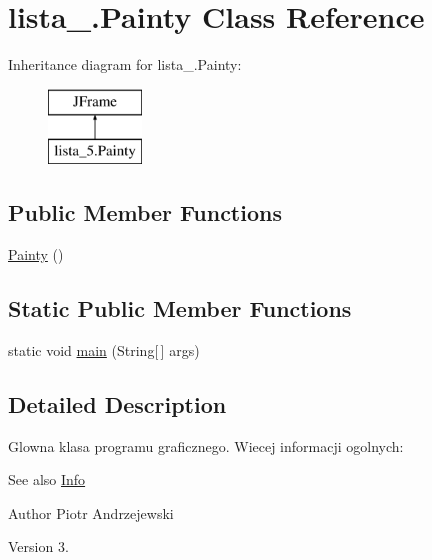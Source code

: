 \hypertarget{classlista__5_1_1_painty}{}\section{lista\+\_.\+Painty Class Reference}
\label{classlista__5_1_1_painty}
Inheritance diagram for lista\+\_.\+Painty\+:\begin{figure}[H]
\begin{center}
\leavevmode
\includegraphics[height=2.000000cm]{classlista__5_1_1_painty}
\end{center}
\end{figure}
\subsection*{Public Member Functions}
\begin{DoxyCompactItemize}
\item 
\mbox{\hyperlink{classlista__5_1_1_painty_a71b4b4d6f8515244d5bd42fe8673d5fd}{Painty}} ()
\end{DoxyCompactItemize}
\subsection*{Static Public Member Functions}
\begin{DoxyCompactItemize}
\item 
static void \mbox{\hyperlink{classlista__5_1_1_painty_a95e397e2f87f16ee08fae4bbf926635e}{main}} (String\mbox{[}$\,$\mbox{]} args)
\end{DoxyCompactItemize}


\subsection{Detailed Description}
Glowna klasa programu graficznego. Wiecej informacji ogolnych\+: \begin{DoxySeeAlso}{See also}
\mbox{\hyperlink{classlista__5_1_1_info}{Info}} 
\end{DoxySeeAlso}
\begin{DoxyAuthor}{Author}
Piotr Andrzejewski 
\end{DoxyAuthor}
\begin{DoxyVersion}{Version}
3. 
\end{DoxyVersion}


